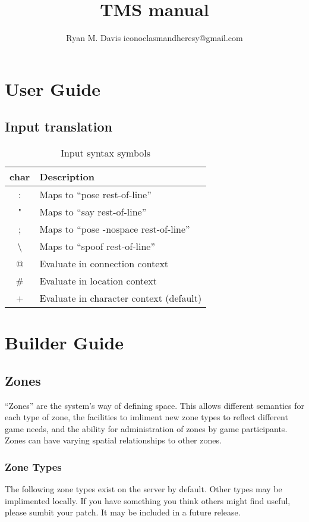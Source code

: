 \documentclass[10pt,letterpaper,twoside]{book}
\author{Ryan M. Davis iconoclasmandheresy@gmail.com}
\title{TMS manual}
\begin{document}
\pagestyle{empty}
\maketitle
\frontmatter
\pagestyle{headings}
\tableofcontents
\listoftables
\mainmatter
\part{User Guide}
\chapter{Input translation}
\begin{table}
\begin{tabular}{c p{}}
char & Description\\
\hline
: & Maps to ``pose rest-of-line''\\
" & Maps to ``say rest-of-line''\\
; & Maps to ``pose -nospace rest-of-line''\\
\textbackslash & Maps to ``spoof rest-of-line''\\
@ & Evaluate in connection context\\
\# & Evaluate in location context\\
+ & Evaluate in character context (default)\\
\hline
\end{tabular}
\caption{Input syntax symbols}
\label{tab:inputsyntaxchars}
\end{table}
\part{Builder Guide}
\chapter{Zones}
``Zones'' are the system's way of defining space.
This allows different semantics for each type of zone, the facilities to imliment new zone types to reflect different game needs, and the ability for administration of zones by game participants.
Zones can have varying spatial relationships to other zones.
\section{Zone Types}
The following zone types exist on the server by default.
Other types may be implimented locally.
If you have something you think others might find useful, please sumbit your patch.
It may be included in a future release.
\end{document}

